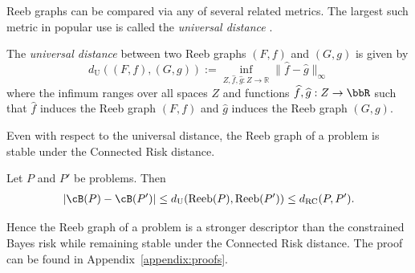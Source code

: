 \documentclass[twoside,11pt]{article}
\newcommand{\dexpcon}[1][]{d_{\operatorname{RC}#1}}
\DeclareMathOperator{\reeb}{Reeb}
\begin{document}
   

    Reeb graphs can be compared via any of several related metrics. The largest such metric in popular use is called the \emph{universal distance} \citep{bauer_reeb_2021}.
    
   
    \begin{definition}
        The \emph{universal distance} between two Reeb graphs $(F,f)$ and $(G,g)$ is given by
        \[d_{\mathrm{U}}((F,f),(G,g)) := \inf_{Z,\widehat f,\widehat g:Z \to \mathbb R} \|\widehat f - \widehat g\|_{\infty}\]
        where the infimum ranges over all spaces $Z$ and functions $\widehat f, \widehat g:Z\to \bbR$ such that $\widehat f$ induces the Reeb graph $(F,f)$ and $\widehat g$ induces the Reeb graph $(G,g)$.
    \end{definition}

    Even with respect to the universal distance, the Reeb graph of a problem is stable under the Connected Risk distance.
    \begin{theorem}\label{thm:reeb-control}
        Let $P$ and $P'$ be problems. Then
        \begin{align*}
            |\cB(P) - \cB(P')| \leq d_{\mathrm{U}}(\reeb(P),\reeb(P')) \leq  \dexpcon(P,P').
        \end{align*}
    \end{theorem}
    Hence the Reeb graph of a problem is a stronger descriptor than the constrained Bayes risk while remaining stable under the Connected Risk distance. The proof can be found in Appendix~\ref{appendix:proofs}.
\end{document}
